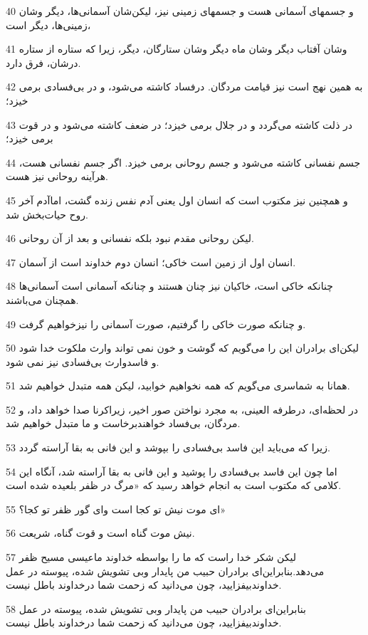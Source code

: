 \par 40 و جسمهای آسمانی هست و جسمهای زمینی نیز، لیکن‌شان آسمانی‌ها، دیگر و‌شان زمینی‌ها، دیگر است،
\par 41 و‌شان آفتاب دیگر و‌شان ماه دیگر و‌شان ستارگان، دیگر، زیرا که ستاره از ستاره در‌شان، فرق دارد.
\par 42 به همین نهج است نیز قیامت مردگان. درفساد کاشته می‌شود، و در بی‌فسادی برمی خیزد؛
\par 43 در ذلت کاشته می‌گردد و در جلال برمی خیزد؛ در ضعف کاشته می‌شود و در قوت برمی خیزد؛
\par 44 جسم نفسانی کاشته می‌شود و جسم روحانی برمی خیزد. اگر جسم نفسانی هست، هرآینه روحانی نیز هست.
\par 45 و همچنین نیز مکتوب است که انسان اول یعنی آدم نفس زنده گشت، اماآدم آخر روح حیات‌بخش شد.
\par 46 لیکن روحانی مقدم نبود بلکه نفسانی و بعد از آن روحانی.
\par 47 انسان اول از زمین است خاکی؛ انسان دوم خداوند است از آسمان.
\par 48 چنانکه خاکی است، خاکیان نیز چنان هستند و چنانکه آسمانی است آسمانی‌ها همچنان می‌باشند.
\par 49 و چنانکه صورت خاکی را گرفتیم، صورت آسمانی را نیزخواهیم گرفت.
\par 50 لیکن‌ای برادران این را می‌گویم که گوشت و خون نمی تواند وارث ملکوت خدا شود و فاسدوارث بی‌فسادی نیز نمی شود.
\par 51 همانا به شماسری می‌گویم که همه نخواهیم خوابید، لیکن همه متبدل خواهیم شد.
\par 52 در لحظه‌ای، درطرفه العینی، به مجرد نواختن صور اخیر، زیراکرنا صدا خواهد داد، و مردگان، بی‌فساد خواهندبرخاست و ما متبدل خواهیم شد.
\par 53 زیرا که می‌باید این فاسد بی‌فسادی را بپوشد و این فانی به بقا آراسته گردد.
\par 54 اما چون این فاسد بی‌فسادی را پوشید و این فانی به بقا آراسته شد، آنگاه این کلامی که مکتوب است به انجام خواهد رسید که «مرگ در ظفر بلعیده شده است.
\par 55 ‌ای موت نیش تو کجا است و‌ای گور ظفر تو کجا؟»
\par 56 نیش موت گناه است و قوت گناه، شریعت.
\par 57 لیکن شکر خدا راست که ما را بواسطه خداوند ماعیسی مسیح ظفر می‌دهد.بنابراین‌ای برادران حبیب من پایدار وبی تشویش شده، پیوسته در عمل خداوندبیفزایید، چون می‌دانید که زحمت شما درخداوند باطل نیست.
\par 58 بنابراین‌ای برادران حبیب من پایدار وبی تشویش شده، پیوسته در عمل خداوندبیفزایید، چون می‌دانید که زحمت شما درخداوند باطل نیست.

